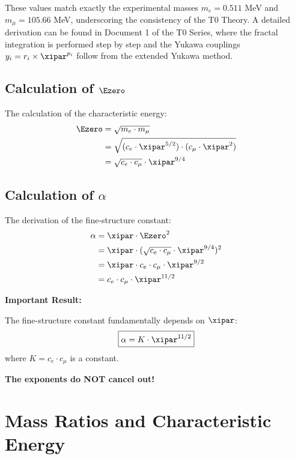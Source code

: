 	These values match exactly the experimental masses $m_e = 0.511$ MeV and $m_\mu = 105.66$ MeV, underscoring the consistency of the T0 Theory. A detailed derivation can be found in Document 1 of the T0 Series, where the fractal integration is performed step by step and the Yukawa couplings $y_i = r_i \times \xipar^{p_i}$ follow from the extended Yukawa method.
	
	\subsection{Calculation of $\Ezero$}
	
	The calculation of the characteristic energy:
	\begin{align}
		\Ezero &= \sqrt{m_e \cdot m_\mu} \\
		&= \sqrt{(c_e \cdot \xipar^{5/2}) \cdot (c_\mu \cdot \xipar^2)} \\
		&= \sqrt{c_e \cdot c_\mu} \cdot \xipar^{9/4}
	\end{align}
	
	\subsection{Calculation of $\alpha$}
	
	The derivation of the fine-structure constant:
	\begin{align}
		\alpha &= \xipar \cdot \Ezero^2 \\
		&= \xipar \cdot (\sqrt{c_e \cdot c_\mu} \cdot \xipar^{9/4})^2 \\
		&= \xipar \cdot c_e \cdot c_\mu \cdot \xipar^{9/2} \\
		&= c_e \cdot c_\mu \cdot \xipar^{11/2}
	\end{align}
	
	\begin{warning}
		\textbf{Important Result:}
		
		The fine-structure constant fundamentally depends on $\xipar$:
		\begin{equation}
			\boxed{\alpha = K \cdot \xipar^{11/2}}
		\end{equation}
		where $K = c_e \cdot c_\mu$ is a constant.
		
		\textbf{The exponents do NOT cancel out!}
	\end{warning}
	
	\section{Mass Ratios and Characteristic Energy}
	

